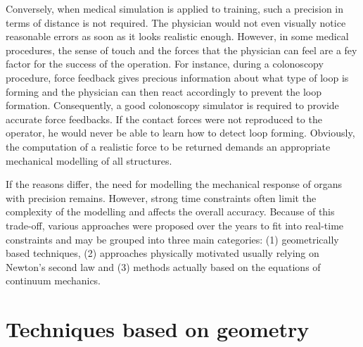 Conversely, when medical simulation is applied to training, such a precision in terms of distance is not required. The physician would not even visually notice reasonable errors as soon as it looks realistic enough. However, in some medical procedures, the sense of touch and the forces that the physician can feel are a fey factor for the success of the operation. For instance, during a colonoscopy procedure, force feedback gives precious information about what type of loop is forming and the physician can then react accordingly to prevent the loop formation. Consequently, a good colonoscopy simulator is required to provide accurate force feedbacks. If the contact forces were not reproduced to the operator, he would never be able to learn how to detect loop forming. Obviously, the computation of a realistic force to be returned demands an appropriate mechanical modelling of all structures. 

If the reasons differ, the need for modelling the mechanical response of organs with precision remains. However, strong time constraints often limit the complexity of the modelling and affects the overall accuracy. Because of this trade-off, various approaches were proposed over the years to fit into real-time constraints and may be grouped into three main categories: (1) geometrically based techniques, (2) approaches physically motivated usually relying on Newton's second law and (3) methods actually based on the equations of continuum mechanics. 



\section{Techniques based on geometry}


